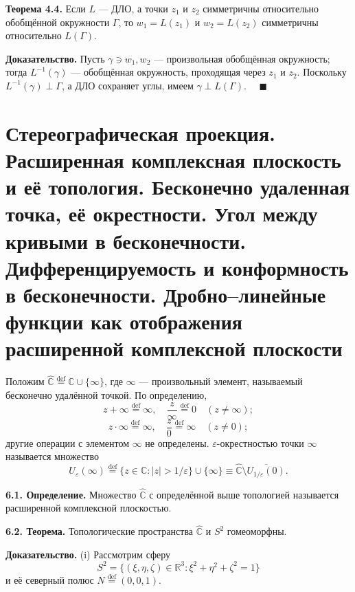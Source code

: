\documentclass[12pt, a4paper]{article}
\theoremstyle{definition}
\theoremstyle{remark}
\begin{document}
\vspace{1em}
\textbf{Теорема 4.4.} Если $L$ — ДЛО, а точки $z_1$ и $z_2$ симметричны относительно обобщённой окружности $\Gamma$, то $w_1 = L(z_1)$ и $w_2 = L(z_2)$ симметричны относительно $L(\Gamma)$.

\textbf{Доказательство.} Пусть $\gamma \ni w_1, w_2$ — произвольная обобщённая окружность; тогда $L^{-1}(\gamma)$ — обобщённая окружность, проходящая через $z_1$ и $z_2$. Поскольку $L^{-1}(\gamma) \perp \Gamma$, а ДЛО сохраняет углы, имеем $\gamma \perp L(\Gamma)$. $\quad \blacksquare$

\newpage
\section{Стереографическая проекция. Расширенная комплексная плоскость и её топология. Бесконечно удаленная точка, её окрестности. Угол между кривыми в бесконечности. Дифференцируемость и конформность в бесконечности. Дробно–линейные функции как отображения расширенной комплексной плоскости}

Положим $\hat{\mathbb{C}} \stackrel{\text{def}}{=} \mathbb{C} \cup \{\infty\}$, где $\infty$ --- произвольный элемент, называемый бесконечно удалённой точкой. По определению,
\[
z + \infty \stackrel{\text{def}}{=} \infty, \quad \frac{z}{\infty} \stackrel{\text{def}}{=} 0 \quad (z \neq \infty);
\]
\[
z \cdot \infty \stackrel{\text{def}}{=} \infty, \quad \frac{z}{0} \stackrel{\text{def}}{=} \infty \quad (z \neq 0);
\]
другие операции с элементом $\infty$ не определены. $\varepsilon$-окрестностью точки $\infty$ называется множество
\[
U_{\varepsilon}(\infty) \stackrel{\text{def}}{=} \{z \in \mathbb{C} : |z| > 1/\varepsilon\} \cup \{\infty\} \equiv \hat{\mathbb{C}} \setminus \overline{U_{1/\varepsilon}(0)}.
\]

\textbf{6.1. Определение.} Множество $\hat{\mathbb{C}}$ с определённой выше топологией называется расширенной комплексной плоскостью.

\textbf{6.2. Теорема.} Топологические пространства $\hat{\mathbb{C}}$ и $S^2$ гомеоморфны.

\textbf{Доказательство.} (i) Рассмотрим сферу
\begin{equation}\tag{6.1}
	S^2 = \{(\xi, \eta, \zeta) \in \mathbb{R}^3 : \xi^2 + \eta^2 + \zeta^2 = 1\}
\end{equation}
и её северный полюс $N \stackrel{\text{def}}{=} (0, 0, 1)$.
\end{document}

